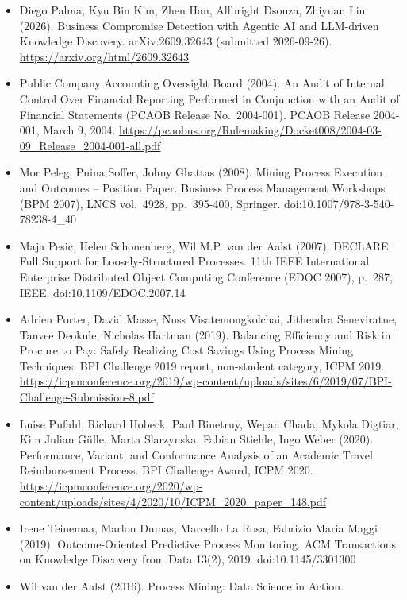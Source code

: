 \documentclass[
  10pt,
]{article}
\begin{document}
\begin{itemize}
  Business-Process and Information Systems Modeling (BPMDS 2013, EMMSAD
  2013), LNBIP vol.~147, pp.~48-62, Springer.
  doi:10.1007/978-3-642-38484-4\_5
\item
  Diego Palma, Kyu Bin Kim, Zhen Han, Allbright Dsouza, Zhiyuan Liu
  (2026). Business Compromise Detection with Agentic AI and LLM-driven
  Knowledge Discovery. arXiv:2609.32643 (submitted 2026-09-26).
  \url{https://arxiv.org/html/2609.32643}
\item
  Public Company Accounting Oversight Board (2004). An Audit of Internal
  Control Over Financial Reporting Performed in Conjunction with an
  Audit of Financial Statements (PCAOB Release No.~2004-001). PCAOB
  Release 2004-001, March 9, 2004.
  \url{https://pcaobus.org/Rulemaking/Docket008/2004-03-09\_Release\_2004-001-all.pdf}
\item
  Mor Peleg, Pnina Soffer, Johny Ghattas (2008). Mining Process
  Execution and Outcomes -- Position Paper. Business Process Management
  Workshops (BPM 2007), LNCS vol.~4928, pp.~395-400, Springer.
  doi:10.1007/978-3-540-78238-4\_40
\item
  Maja Pesic, Helen Schonenberg, Wil M.P. van der Aalst (2007). DECLARE:
  Full Support for Loosely-Structured Processes. 11th IEEE International
  Enterprise Distributed Object Computing Conference (EDOC 2007),
  p.~287, IEEE. doi:10.1109/EDOC.2007.14
\item
  Adrien Porter, David Masse, Nuss Visatemongkolchai, Jithendra
  Seneviratne, Tanvee Deokule, Nicholas Hartman (2019). Balancing
  Efficiency and Risk in Procure to Pay: Safely Realizing Cost Savings
  Using Process Mining Techniques. BPI Challenge 2019 report,
  non-student category, ICPM 2019.
  \url{https://icpmconference.org/2019/wp-content/uploads/sites/6/2019/07/BPI-Challenge-Submission-8.pdf}
\item
  Luise Pufahl, Richard Hobeck, Paul Binetruy, Wepan Chada, Mykola
  Digtiar, Kim Julian Gülle, Marta Slarzynska, Fabian Stiehle, Ingo
  Weber (2020). Performance, Variant, and Conformance Analysis of an
  Academic Travel Reimbursement Process. BPI Challenge Award, ICPM 2020.
  \url{https://icpmconference.org/2020/wp-content/uploads/sites/4/2020/10/ICPM\_2020\_paper\_148.pdf}
\item
  Irene Teinemaa, Marlon Dumas, Marcello La Rosa, Fabrizio Maria Maggi
  (2019). Outcome-Oriented Predictive Process Monitoring. ACM
  Transactions on Knowledge Discovery from Data 13(2), 2019.
  doi:10.1145/3301300
\item
  Wil van der Aalst (2016). Process Mining: Data Science in Action.

\end{itemize}
\end{document}
